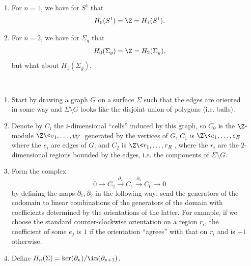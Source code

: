 \begin{example}
    \begin{enumerate}
        \item For $n = 1$, we have for $S^1$ that \[H_0(S^1) = \Z = H_1(S^1).\]
        \item For $n = 2$, we have for $\Sigma_g$ that \[H_0(\Sigma_g) = \Z = H_2(\Sigma_g),\] but what about $H_1(\Sigma_g)$. 
    \end{enumerate}
\end{example}

\vspace{.5cm}
\begin{definition}$ $
    \begin{enumerate}
        \item Start by drawing a graph $G$ on a surface $\Sigma$ such that the edges are oriented in some way and $\Sigma \setminus G$ looks like the disjoint union of polygons (i.e. balls).
        \item Denote by $C_i$ the $i$-dimensional ``cells'' induced by this graph, so $C_0$ is the $\Z$-module $\Z\<v_1,\dots,v_V\>$ generated by the vertices of $G$, $C_1$ is $\Z\<e_1,\dots,e_E\>$ where the $e_i$ are edges of $G$, and $C_2$ is $\Z\<r_1,\dots,r_R\>$, where the $r_i$ are the $2$-dimensional regions bounded by the edges, i.e. the components of $\Sigma\setminus G$.
        \item Form the complex \[0 \to C_2 \xrightarrow{\partial_2} C_1 \xrightarrow{\partial_1} C_0 \to 0\] by defining the maps $\partial_1,\partial_2$ in the following way: send the generators of the codomain to linear combinations of the generators of the domain with coefficients determined by the orientations of the latter. For example, if we choose the standard counter-clockwise orientation on a region $r_i$, the coefficient of some $e_j$ is $1$ if the orientation ``agrees'' with that on $r_i$ and is $-1$ otherwise.
        \item Define $H_n(\Sigma) = \ker(\partial_n)/\im(\partial_{n + 1})$.
    \end{enumerate}
\end{definition}

